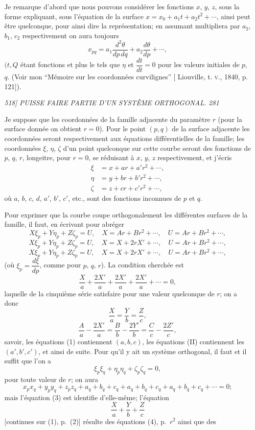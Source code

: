 \documentclass[11pt,a4paper]{book}
\begin{document}
Je remarque d'abord que nous pouvons consid\'erer les fonctions $x$, $y$, $z$, sous la
forme expliquant, sous l'\'equation de la surface $x = x_0 + a_1 t + a_2 t^2 + \cdots$, ainsi
peut \^etre quelconque, pour ainsi dire la repr\'esentation; en assumant multipliera par
$a_2$, $b_1$, $c_2$ respectivement on aura toujours
\[
x_{pq} = a_1\frac{d^2 \theta}{d p \, d q} + a_2\frac{d \theta}{dp} + \cdots,
\]
$(t, Q$ \'etant fonctions et plus le tels que $\eta$ et $\dfrac{d t}{dt} = 0$
pour les valeurs initiales de $p$, $q$. (Voir mon ``M\'emoire sur les coordonn\'ees curvilignes''
[ Liouville, t. \textsc{v.}, 1840, p. 121]).

\clearpage

\noindent\textit{518] \hfill PUISSE FAIRE PARTIE D'UN SYST\`EME ORTHOGONAL. \hfill 281}

\medskip

Je suppose que les coordonn\'ees de la famille adjacente du param\`etre $r$ (pour la
surface donn\'ee on obtient $r = 0$). Pour le point $(p, q)$ de la surface adjacente les
coordonn\'ees seront respectivement aux \'equations diff\'erentielles de la famille; les
coordonn\'ees $\xi$, $\eta$, $\zeta$ d'un point quelconque sur cette courbe seront des fonctions de
$p$, $q$, $r$, longeitre, pour $r = 0$, se r\'eduisant \`a $x$, $y$, $z$ respectivement, et j'\'ecris
\begin{align*}
\xi &= x + ar + a'r^2 + \cdots,\\
\eta &= y + br + b'r^2 + \cdots,\\
\zeta &= z + cr + c'r^2 + \cdots,
\end{align*}
o\`u $a$, $b$, $c$, $d$, $a'$, $b'$, $c'$, etc., sont des fonctions inconnues de $p$ et $q$.

Pour exprimer que la courbe coupe orthogonalement les diff\'erentes surfaces de la famille, il faut, en \'ecrivant pour abr\'eger
\[
X\xi_p + Y\eta_p + Z\zeta_p = U, \quad X = A r + B r^2 + \cdots, \quad U = A r + B r^2 + \cdots,
\]
\[
X\xi_p + Y\eta_p + Z\zeta_p = U, \quad X = X + 2 r X' + \cdots, \quad U = A r + B r^2 + \cdots,
\]
\[
X\xi_p + Y\eta_p + Z\zeta_p = U, \quad X = X + 2 r X' + \cdots, \quad U = A r + B r^2 + \cdots,
\]
(o\`u $\xi_p = \dfrac{d\xi}{dp}$, comme pour $p$, $q$, $r$). La condition cherch\'ee est
\[
\frac{X}{a} + \frac{2X'}{a} + \frac{2X'}{a} + \frac{2X'}{a} + \cdots = 0,
\]
laquelle de la cinqui\`eme s\'erie satisfaire pour une valeur quelconque de $r$; on a donc
\[
\frac{X}{a} = \frac{Y}{b} = \frac{Z}{c},
\]
\[
\frac{A}{a} - \frac{2X'}{a} = \frac{B}{b} - \frac{2Y'}{b} = \frac{C}{c} - \frac{2Z'}{c},
\]
savoir, les \'equations (1) contiennent $(a, b, c)$, les \'equations (II) contiennent les
$(a', b', c')$, et ainsi de suite. Pour qu'il y ait un syst\`eme orthogonal, il faut et il suffit que l'on a
\[
\xi_p \xi_q + \eta_p \eta_q + \zeta_p \zeta_q = 0,
\]
pour toute valeur de $r$; on aura
\[
x_p x_q + y_p y_q + z_p z_q + a_q + b_q + c_q + a_q + b_q + c_q + a_q + b_q + c_q + \cdots = 0;
\]
mais l'\'equation (3) est identifie d'elle-m\^eme; l'\'equation
\[
\frac{X}{a} + \frac{Y}{b} + \frac{Z}{c}
\]
[continues sur (1), p.~(2)] r\'esulte des \'equations (4), p.~$r^2$ ainsi que des
\end{document}
